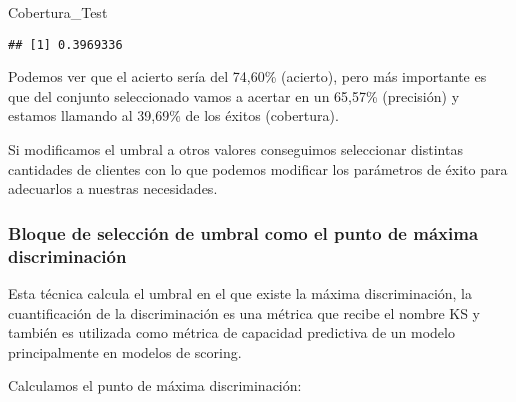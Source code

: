 \documentclass[]{article}
\newenvironment{Shaded}{\begin{snugshade}}{\end{snugshade}}
\newcommand{\NormalTok}[1]{#1}
\begin{document}
\begin{Shaded}
\begin{Highlighting}[]
\NormalTok{Cobertura_Test}
\end{Highlighting}
\end{Shaded}

\begin{verbatim}
## [1] 0.3969336
\end{verbatim}

Podemos ver que el acierto sería del 74,60\% (acierto), pero más
importante es que del conjunto seleccionado vamos a acertar en un
65,57\% (precisión) y estamos llamando al 39,69\% de los éxitos
(cobertura).

Si modificamos el umbral a otros valores conseguimos seleccionar
distintas cantidades de clientes con lo que podemos modificar los
parámetros de éxito para adecuarlos a nuestras necesidades.

\subsubsection{Bloque de selección de umbral como el punto de máxima
discriminación}\label{bloque-de-seleccion-de-umbral-como-el-punto-de-maxima-discriminacion}

Esta técnica calcula el umbral en el que existe la máxima
discriminación, la cuantificación de la discriminación es una métrica
que recibe el nombre KS y también es utilizada como métrica de capacidad
predictiva de un modelo principalmente en modelos de scoring.

Calculamos el punto de máxima discriminación:
\end{document}

